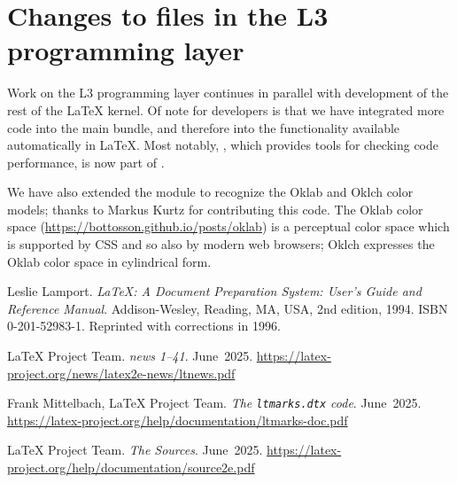 \documentclass{ltnews}
\providecommand\tubcommand[1]{}
\begin{document}
\section{Changes to files in the L3 programming layer}


Work on the L3 programming layer continues in parallel with
development of the rest of the \LaTeX{} kernel.  Of note for
developers is that we have integrated more code into the main
 bundle, and therefore into the functionality available
automatically in \LaTeX{}. Most notably, , which
provides tools for checking code performance, is now part of
.

We have also extended the  module to recognize the Oklab
and Oklch color models; thanks to Markus Kurtz for contributing this
code. The Oklab color space
(\url{https://bottosson.github.io/posts/oklab}) is a perceptual color
space which is supported by CSS and so also by modern web browsers;
Oklch expresses the Oklab color space in cylindrical form.

\tubcommand{\SetBibJustification{\raggedright
                                 \advance\itemsep by 1pt plus1pt minus1pt }}

\begin{thebibliography}{9}\frenchspacing


Leslie Lamport.
\newblock \emph{{\LaTeX}: {A} Document Preparation System: User's Guide and Reference
  Manual}.
\newblock \mbox{Addison}-Wesley, Reading, MA, USA, 2nd edition, 1994.
\newblock ISBN 0-201-52983-1.
\newblock Reprinted with corrections in 1996.

 \LaTeX{} Project Team.
  \emph{\LaTeXe{} news 1--41}. June~2025.
  \url{https://latex-project.org/news/latex2e-news/ltnews.pdf}

 Frank Mittelbach, \LaTeX{} Project Team.
  \emph{The \texttt{ltmarks.dtx} code}. June~2025.\tubcommand{\\}
  \url{https://latex-project.org/help/documentation/ltmarks-doc.pdf}

 \LaTeX{} Project Team.
  \emph{The \LaTeXe{} Sources}. June~2025.
  \url{https://latex-project.org/help/documentation/source2e.pdf}

\end{thebibliography}
\end{document}
